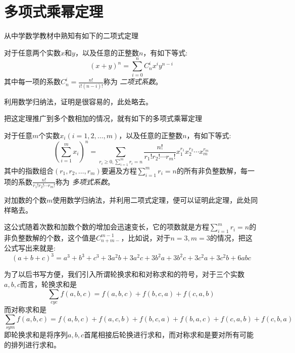 
\section{多项式乘幂定理}
\label{sec:polynomial-power-theorem}

从中学数学教材中熟知有如下的二项式定理
\begin{theorem}[二项式定理]
  对于任意两个实数$x$和$y$，以及任意的正整数$n$，有如下等式:
  \begin{equation}
    \label{eq:binomial-theorem}
    (x+y)^n = \sum_{i=0}^n C_n^i x^iy^{n-i}
  \end{equation}
  其中每一项的系数$C_n^i=\frac{n!}{i!(n-i)!}$称为 \emph{二项式系数}。
\end{theorem}

利用数学归纳法，证明是很容易的，此处略去。

把这定理推广到多个数相加的情况，就有如下的多项式乘幂定理
\begin{theorem}[多项式乘幂定理]
  对于任意$m$个实数$x_i(i=1,2,\ldots,m)$，以及任意的正整数$n$，有如下等式:
  \begin{equation}
    \label{eq:polynomial-theorem}
    \left( \sum_{i=1}^m x_i \right)^n = \sum_{r_{i} \geqslant 0,\sum_{i=1}^{m}r_{i}=n} \frac{n!}{r_1!r_2!\cdots r_m!}x_1^{r_1}x_2^{r_2}\cdots x_m^{r_m}
  \end{equation}
  其中的指数组合$(r_1,r_2,\ldots,r_{m})$要遍及方程$\sum_{i=1}^{m}r_{i}=n$的所有非负整数解，每一项的系数$\frac{n!}{r_1!r_{2}!\cdots r_{m}!}$称为 \emph{多项式系数}。
\end{theorem}

对加数的个数$m$使用数学归纳法，并利用二项式定理，便可以证明此定理，此处同样略去。

这公式随着次数和加数个数的增加会迅速变长，它的项数就是方程$\sum_{i=1}^mr_i=n$的非负整数解的个数，这个值是$C_{n+m-}^{m-1}$，比如说，对于$n=3,m=3$的情况，把这公式写出来就是:
\begin{equation*}
  (a+b+c)^3 = a^3+b^3+c^3+3a^2b+3a^2c+3b^2a+3b^2c+3c^2a+3c^2b+6abc
\end{equation*}

为了以后书写方便，我们引入所谓轮换求和和对称求和的符号，对于三个实数$a,b,c$而言，轮换求和是
\begin{equation*}
  \sum_{cyc} f(a,b,c) = f(a,b,c) + f(b, c, a) + f(c, a ,b)
\end{equation*}
而对称求和是
\begin{equation*}
  \sum_{sym} f(a,b,c) = f(a, b, c) + f(a, c, b) + f(b, c, a) + f(b, a, c) + f(c, a, b) + f(c, b, a)
\end{equation*}
即轮换求和是将序列$a,b,c$首尾相接后轮换进行求和，而对称求和是要对所有可能的排列进行求和。


